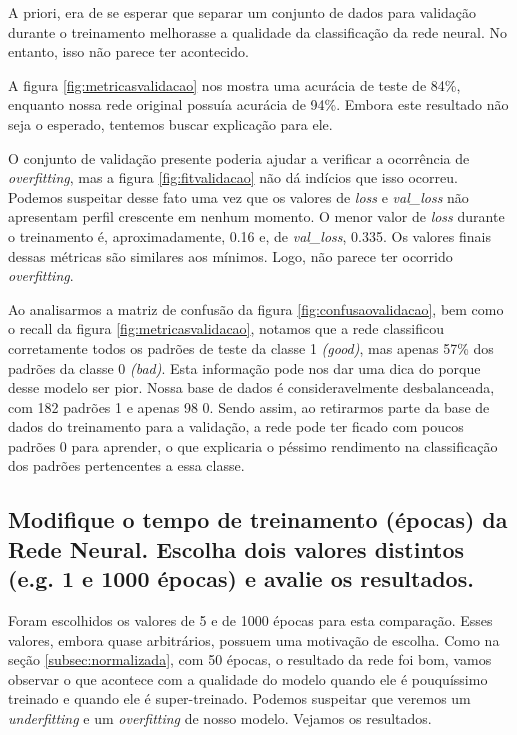 \documentclass[12pt]{article}
\begin{document}
A priori, era de se esperar que separar um conjunto de dados para validação durante o treinamento melhorasse a qualidade da classificação da rede neural. No entanto, isso não parece ter acontecido.

A figura \ref{fig:metricasvalidacao} nos mostra uma acurácia de teste de 84\%, enquanto nossa rede original possuía acurácia de 94\%. Embora este resultado não seja o esperado, tentemos buscar explicação para ele.

O conjunto de validação presente poderia ajudar a verificar a ocorrência de \textit{overfitting}, mas a figura \ref{fig:fitvalidacao} não dá indícios que isso ocorreu. Podemos suspeitar desse fato uma vez que os valores de \textit{loss} e \textit{val\_loss} não apresentam perfil crescente em nenhum momento. O menor valor de \textit{loss} durante o treinamento é, aproximadamente, 0.16 e, de \textit{val\_loss}, 0.335. Os valores finais dessas métricas são similares aos mínimos. Logo, não parece ter ocorrido \textit{overfitting}.

Ao analisarmos a matriz de confusão da figura \ref{fig:confusaovalidacao}, bem como o recall da figura \ref{fig:metricasvalidacao}, notamos que a rede classificou corretamente todos os padrões de teste da classe 1 \textit{(good)}, mas apenas 57\% dos padrões da classe 0 \textit{(bad)}. Esta informação pode nos dar uma dica do porque desse modelo ser pior. Nossa base de dados é consideravelmente desbalanceada, com 182 padrões 1 e apenas 98 0. Sendo assim, ao retirarmos parte da base de dados do treinamento para a validação, a rede pode ter ficado com poucos padrões 0 para aprender, o que explicaria o péssimo rendimento na classificação dos padrões pertencentes a essa classe.

\subsection{Modifique o tempo de treinamento (épocas) da Rede Neural. Escolha dois valores distintos (e.g. 1 e 1000 épocas) e avalie os resultados.}

Foram escolhidos os valores de 5 e de 1000 épocas para esta comparação. Esses valores, embora quase arbitrários, possuem uma motivação de escolha. Como na seção \ref{subsec:normalizada}, com 50 épocas, o resultado da rede foi bom, vamos observar o que acontece com a qualidade do modelo quando ele é pouquíssimo treinado e quando ele é super-treinado. Podemos suspeitar que veremos um \textit{underfitting} e um \textit{overfitting} de nosso modelo. Vejamos os resultados.
\end{document}
